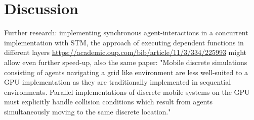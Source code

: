 \section{Discussion}
Further research: implementing synchronous agent-interactions in a concurrent implementation with STM, the approach of executing dependent functions in different layers \url{https://academic.oup.com/bib/article/11/3/334/225993} might allow even further speed-up, also the same paper: "Mobile discrete simulations consisting of agents navigating a grid like environment are less well-suited to a GPU implementation as they are traditionally implemented in sequential environments. Parallel implementations of discrete mobile systems on the GPU must explicitly handle collision conditions which result from agents simultaneously moving to the same discrete location."

